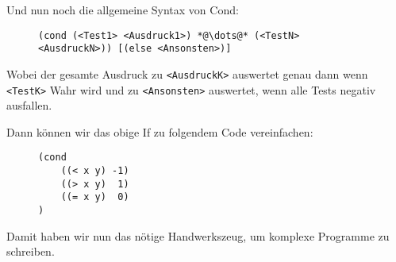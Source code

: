 	Und nun noch die allgemeine Syntax von Cond:
	\begin{figure}[H]
		\centering
		\lstinline[language = Racket]|(cond (<Test1> <Ausdruck1>) *@\dots@* (<TestN> <AusdruckN>)) [(else <Ansonsten>)]|
	\end{figure}
	Wobei der gesamte Ausdruck zu \texttt{<AusdruckK>} auswertet genau dann wenn \texttt{<TestK>} Wahr wird und zu \texttt{<Ansonsten>} auswertet, wenn alle Tests negativ ausfallen.
	
	Dann können wir das obige If zu folgendem Code vereinfachen:
	\begin{figure}[H]
		\centering
		\begin{lstlisting}[language = Racket]
(cond
	((< x y) -1)
	((> x y)  1)
	((= x y)  0)
)
\end{lstlisting}
	\end{figure}

	Damit haben wir nun das nötige Handwerkszeug, um komplexe Programme zu schreiben.
